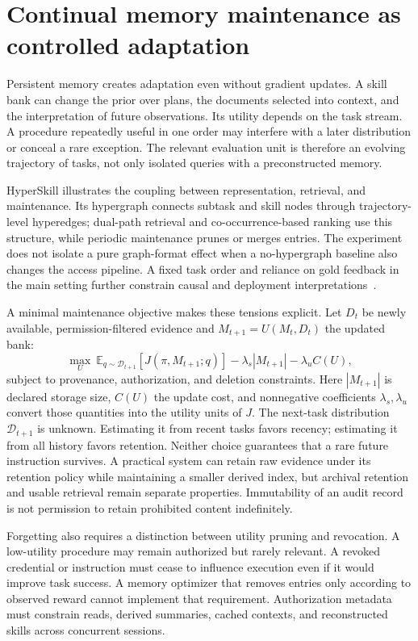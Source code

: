 \section{Continual memory maintenance as controlled adaptation}\label{sec:C30:05}
Persistent memory creates adaptation even without gradient updates. A skill bank can change the prior over plans, the documents selected into context, and the interpretation of future observations. Its utility depends on the task stream. A procedure repeatedly useful in one order may interfere with a later distribution or conceal a rare exception. The relevant evaluation unit is therefore an evolving trajectory of tasks, not only isolated queries with a preconstructed memory.

HyperSkill illustrates the coupling between representation, retrieval, and maintenance. Its hypergraph connects subtask and skill nodes through trajectory-level hyperedges; dual-path retrieval and co-occurrence-based ranking use this structure, while periodic maintenance prunes or merges entries. The experiment does not isolate a pure graph-format effect when a no-hypergraph baseline also changes the access pipeline. A fixed task order and reliance on gold feedback in the main setting further constrain causal and deployment interpretations~\cite{xu2026hyperskill}.

A minimal maintenance objective makes these tensions explicit. Let $D_t$ be newly available, permission-filtered evidence and $M_{t+1}=U(M_t,D_t)$ the updated bank:
\begin{equation}
 \max_U\ \mathbb E_{q\sim\mathcal D_{t+1}}
 [J(\pi,M_{t+1};q)]
 -\lambda_s|M_{t+1}|-\lambda_u C(U),
\end{equation}
subject to provenance, authorization, and deletion constraints. Here $|M_{t+1}|$ is declared storage size, $C(U)$ the update cost, and nonnegative coefficients $\lambda_s,\lambda_u$ convert those quantities into the utility units of $J$. The next-task distribution $\mathcal D_{t+1}$ is unknown. Estimating it from recent tasks favors recency; estimating it from all history favors retention. Neither choice guarantees that a rare future instruction survives. A practical system can retain raw evidence under its retention policy while maintaining a smaller derived index, but archival retention and usable retrieval remain separate properties. Immutability of an audit record is not permission to retain prohibited content indefinitely.

Forgetting also requires a distinction between utility pruning and revocation. A low-utility procedure may remain authorized but rarely relevant. A revoked credential or instruction must cease to influence execution even if it would improve task success. A memory optimizer that removes entries only according to observed reward cannot implement that requirement. Authorization metadata must constrain reads, derived summaries, cached contexts, and reconstructed skills across concurrent sessions.


